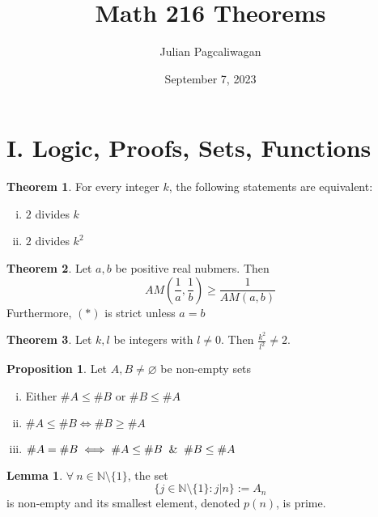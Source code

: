 \documentclass{report}
\title{Math 216 Theorems}
\author{Julian Pagcaliwagan}
\date{September 7, 2023}
\theoremstyle{definition}
\newtheorem{lem}{Lemma}
\newtheorem{prop}{Proposition}
\begin{document}
\maketitle
\section*{I. Logic, Proofs, Sets, Functions}

\newtheorem{t1}{Theorem}
\begin{t1}
    For every integer $k$, the following statements
    are equivalent:
    \begin{enumerate}[(i)]
        \item $2$ divides $k$
        \item $2$ divides $k^2$
    \end{enumerate}
\end{t1}

\begin{t1}
    Let $a, b$ be positive real nubmers. Then
    \begin{equation} \tag{$\star$}
        AM( \frac{1}{a},  \frac{1}{b}) \geq  \frac{1}{AM(a,b)}
    \end{equation}
    Furthermore, $(*)$ is strict unless $a=b$
\end{t1}

\begin{t1}
    Let $k, l$  be integers with $l \neq 0$. Then $  \frac{k^2}{l^2} \neq 2$.
\end{t1}

\begin{prop}
    Let $  A, B \neq \varnothing $ be non-empty sets
    \begin{enumerate}[(i)]
        \item  Either $\#A \leq \#B$ or $ \#B \leq \#A  $
        \item $ \#A \leq \#B \iff \#B \geq \#A  $
        \item $  \#A = \#B \iff \#A \leq \#B \And \#B \leq \#A$
    \end{enumerate}
\end{prop}

\begin{lem}
    $  \forall \  n \in \mathbb{N} \setminus \{1\} $, the set
    \begin{equation}
    \{ j \in \mathbb{N} \setminus \{ 1 \} : j \vert n \} := A_n
    \end{equation}
    is non-empty and its smallest element, denoted $ p(n)  $, is prime.
\end{lem}
\end{document}
